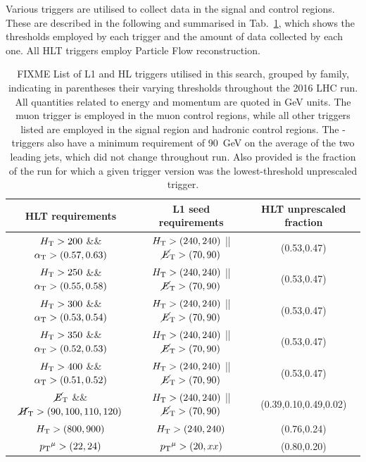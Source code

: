 Various triggers are utilised to collect data in the signal and control 
regions. These are described in the following and summarised in 
Tab.~\ref{tab:triggers}, which shows the thresholds employed by each trigger 
and the amount of data collected by each one. All HLT triggers employ Particle 
Flow reconstruction.

\begin{table}[h]
\footnotesize
\centering
\begin{tabular}{ccc}
\hline
HLT requirements & L1 seed requirements & HLT unprescaled fraction \\
\hline\hline
$\mbox{$H_\text{T}$}>200$ \&\& $\alpha_{\text{T}}>(0.57,0.63)$ & $\mbox{$H_\text{T}$}>(240,240)$ || 
$\mbox{$\cancel{E}_\text{T}$}>(70,90)$ & (0.53,0.47) \\
$\mbox{$H_\text{T}$}>250$ \&\& $\alpha_{\text{T}}>(0.55,0.58)$ & $\mbox{$H_\text{T}$}>(240,240)$ || 
$\mbox{$\cancel{E}_\text{T}$}>(70,90)$ & (0.53,0.47) \\
$\mbox{$H_\text{T}$}>300$ \&\& $\alpha_{\text{T}}>(0.53,0.54)$ & $\mbox{$H_\text{T}$}>(240,240)$ || 
$\mbox{$\cancel{E}_\text{T}$}>(70,90)$ & (0.53,0.47) \\
$\mbox{$H_\text{T}$}>350$ \&\& $\alpha_{\text{T}}>(0.52,0.53)$ & $\mbox{$H_\text{T}$}>(240,240)$ || 
$\mbox{$\cancel{E}_\text{T}$}>(70,90)$ & (0.53,0.47) \\
$\mbox{$H_\text{T}$}>400$ \&\& $\alpha_{\text{T}}>(0.51,0.52)$ & $\mbox{$H_\text{T}$}>(240,240)$ || 
$\mbox{$\cancel{E}_\text{T}$}>(70,90)$ & (0.53,0.47) \\
\hline
$\mbox{$\cancel{E}_\text{T}$}$ \&\& $\mbox{$\cancel{H}_\text{T}$}>(90,100,110,120)$ & $\mbox{$H_\text{T}$}>(240,240)$ || 
$\mbox{$\cancel{E}_\text{T}$}>(70,90)$ & (0.39,0.10,0.49,0.02) \\
\hline
$\mbox{$H_\text{T}$}>(800,900)$ & $\mbox{$H_\text{T}$}>(240,240)$ & (0.76,0.24) \\
\hline
${p_{\text T}}^\mu>(22,24)$ & ${p_{\text T}}^\mu>(20,xx)$ & (0.80,0.20) \\
\hline
\end{tabular}
\caption{FIXME List of L1 and HL triggers utilised in this search, grouped by 
family, 
indicating in parentheses their varying thresholds throughout the 2016 LHC run. 
All quantities related to energy and momentum are quoted in GeV units.
The muon trigger is employed in the muon 
control regions, while all other triggers listed are employed in the signal 
region and hadronic control regions.
The \scalht-\alphat triggers also have a minimum requirement of 90~GeV on the 
average \pt of the two leading jets, which did not change throughout run.
Also provided is the fraction of the run for which a given trigger version was 
the lowest-threshold unprescaled trigger.}
\label{tab:triggers}
\end{table}

